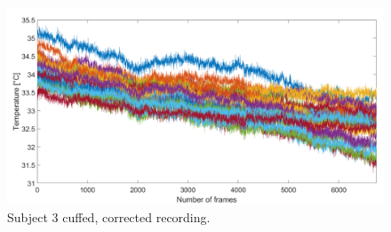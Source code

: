 \begin{figure}[htbp]
\begin{minipage}[b]{0.45\linewidth}
	\end{minipage}
	\hspace{0.2cm}
	\begin{minipage}[b]{0.45\linewidth}
		\centering
		\includegraphics[width=\linewidth]{figures/Recordings/Sub3_cuffed_corr}
		\caption{Subject 3 cuffed, corrected recording.}
	
	\end{minipage}
\end{figure}



